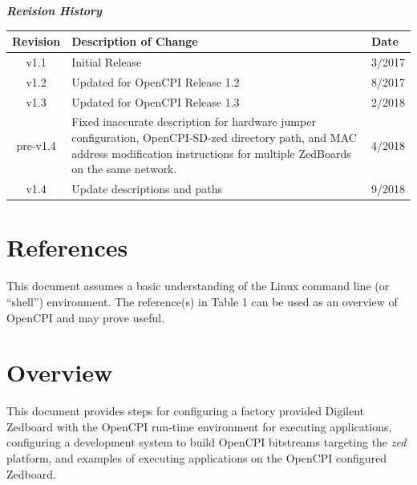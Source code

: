 	\begin{center}
	\textit{\textbf{Revision History}}
		\begin{table}[H]
		\label{table:revisions} %
			\begin{tabularx}{\textwidth}{|c|X|l|}
			\hline
			\rowcolor{blue}
			\textbf{Revision} & \textbf{Description of Change} & \textbf{Date} \\
		    \hline
		    v1.1 & Initial Release & 3/2017 \\
            \hline
            v1.2 & Updated for OpenCPI Release 1.2 & 8/2017 \\
            \hline
            v1.3 & Updated for OpenCPI Release 1.3 & 2/2018 \\
            \hline
            pre-v1.4 & Fixed inaccurate description for hardware jumper configuration, OpenCPI-SD-zed directory path, and MAC address modification instructions for multiple ZedBoards on the same network. & 4/2018 \\
            \hline
            v1.4 & Update descriptions and paths & 9/2018 \\
            \hline
			\end{tabularx}
		\end{table}
	\end{center}

\newpage

\tableofcontents

\newpage

\section{References}
	This document assumes a basic understanding of the Linux command line (or ``shell'') environment.  The reference(s) in Table 1 can be used as an overview of OpenCPI and may prove useful.
\def\refskipocpiov{}
\def\refcapbottom{}


\newpage
\section{Overview}
This document provides steps for configuring a factory provided Digilent Zedboard with the OpenCPI run-time environment for executing applications, configuring a development system to build OpenCPI bitstreams targeting the \textit{zed} platform, and examples of executing applications on the OpenCPI configured Zedboard.

